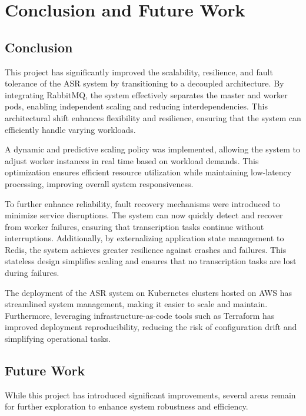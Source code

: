 \chapter{Conclusion and Future Work} \label{chapter:conclusion_and_future_work}

\section{Conclusion}

This project has significantly improved the scalability, resilience, and fault tolerance of the ASR system by transitioning to a decoupled architecture. By integrating RabbitMQ, the system effectively separates the master and worker pods, enabling independent scaling and reducing interdependencies. This architectural shift enhances flexibility and resilience, ensuring that the system can efficiently handle varying workloads.  

A dynamic and predictive scaling policy was implemented, allowing the system to adjust worker instances in real time based on workload demands. This optimization ensures efficient resource utilization while maintaining low-latency processing, improving overall system responsiveness.  

To further enhance reliability, fault recovery mechanisms were introduced to minimize service disruptions. The system can now quickly detect and recover from worker failures, ensuring that transcription tasks continue without interruptions. Additionally, by externalizing application state management to Redis, the system achieves greater resilience against crashes and failures. This stateless design simplifies scaling and ensures that no transcription tasks are lost during failures.  

The deployment of the ASR system on Kubernetes clusters hosted on AWS has streamlined system management, making it easier to scale and maintain. Furthermore, leveraging infrastructure-as-code tools such as Terraform has improved deployment reproducibility, reducing the risk of configuration drift and simplifying operational tasks.  

\section{Future Work}

While this project has introduced significant improvements, several areas remain for further exploration to enhance system robustness and efficiency.

